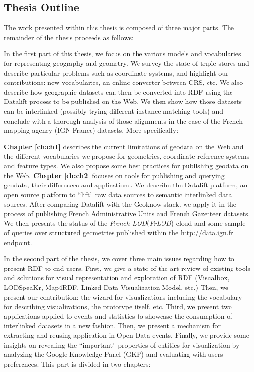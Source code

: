 \begin{enumerate}
\section{Thesis Outline}
\label{sec:thesis-structure}

The work presented within this thesis is composed of three major parts. The remainder of the thesis proceeds as follows:


In the first part of this thesis, we focus on the various models and vocabularies for representing geography and geometry. We survey the state of triple stores and describe particular problems such as coordinate systems, and highlight our contributions: new vocabularies, an online converter between CRS, etc. We also describe how geographic datasets can then be converted into RDF using the Datalift process to be published on the Web. We then show how those datasets can be interlinked (possibly trying different instance matching tools) and  conclude with a thorough analysis of those alignments in the case of the French mapping agency (IGN-France) datasets. More specifically:

 
  \textbf{Chapter \ref{ch:ch1}} describes the current limitations of geodata on the Web and the different vocabularies we propose for geometries, coordinate reference systems and feature  types. We also propose  some best practices for publishing geodata on the Web.
 \textbf{Chapter \ref{ch:ch2}} focuses on tools for publishing and querying geodata, their differences and applications. We describe the Datalift platform, an open source platform to ``lift'' raw data sources to semantic interlinked data sources. After comparing Datalift with the Geoknow stack, we apply it in the process of publishing French Administrative Units and French Gazetteer datasets. We then presents the status of the \textit{French LOD}(\textit{FrLOD}) cloud and some sample of queries over structured geometries published within the \url{http://data.ign.fr} endpoint. 
 

 In the second part of the thesis, we cover three main issues regarding how to present RDF to end-users. First, we give a state of the art review of existing tools and solutions for visual representation and exploration of RDF (Visualbox, LODSpeaKr, Map4RDF, Linked Data Visualization Model, etc.) Then, we present our contribution: the wizard for visualizations including the vocabulary for describing visualizations, the prototype itself, etc. Third, we present two applications applied to events and statistics to showcase the consumption of interlinked datasets in a new fashion. Then, we present a mechanism for extracting and reusing application in Open Data events. Finally, we provide some insights on revealing the ``important'' properties of entities for visualization by analyzing the Google Knowledge Panel (GKP) and evaluating with users preferences. This part is divided in two chapters:
 

\end{enumerate}

